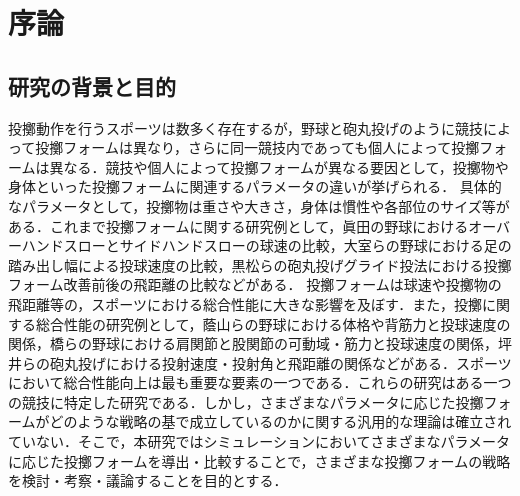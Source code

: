 \chapter[序論]%
        {序論}
        \section{研究の背景と目的}
        投擲動作を行うスポーツは数多く存在するが，野球と砲丸投げのように競技によって投擲フォームは異なり，さらに同一競技内であっても個人によって投擲フォームは異なる．競技や個人によって投擲フォームが異なる要因として，投擲物や身体といった投擲フォームに関連するパラメータの違いが挙げられる．
        具体的なパラメータとして，投擲物は重さや大きさ，身体は慣性や各部位のサイズ等がある．これまで投擲フォームに関する研究例として，眞田の野球におけるオーバーハンドスローとサイドハンドスローの球速の比較\cite{sanada}，大室らの野球における足の踏み出し幅による投球速度の比較\cite{omuro}，黒松らの砲丸投げグライド投法における投擲フォーム改善前後の飛距離の比較\cite{kuromatsu}などがある．
        投擲フォームは球速や投擲物の飛距離等の，スポーツにおける総合性能に大きな影響を及ぼす．また，投擲に関する総合性能の研究例として，蔭山らの野球における体格や背筋力と投球速度の関係\cite{kageyama}，橋らの野球における肩関節と股関節の可動域・筋力と投球速度の関係\cite{takahashi}，坪井らの砲丸投げにおける投射速度・投射角と飛距離の関係\cite{tsuboi}などがある．スポーツにおいて総合性能向上は最も重要な要素の一つである．これらの研究はある一つの競技に特定した研究である．しかし，さまざまなパラメータに応じた投擲フォームがどのような戦略の基で成立しているのかに関する汎用的な理論は確立されていない．そこで，本研究ではシミュレーションにおいてさまざまなパラメータに応じた投擲フォームを導出・比較することで，さまざまな投擲フォームの戦略を検討・考察・議論することを目的とする．\\

